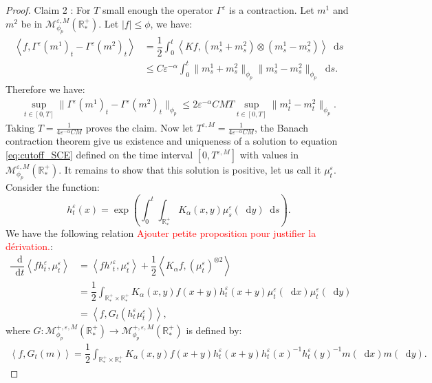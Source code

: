 \documentclass[11pt,a4paper]{article}
\newcommand{\RRP}{\mathbb{R}^+_*}
\newcommand{\MC}{\mathcal{M}}
\newcommand{\red}[1]{\textcolor{red}{#1}}
\newcommand{\brac}[1]{\left\langle#1\right\rangle}
\newcommand{\dd}{\mathop{}\!\mathrm{d}}
\begin{document}
\begin{proof}
    Claim 2 : For $T$ small enough the operator $\Gamma^\varepsilon$ is a contraction. Let $m^1$ and $m^2$ be in $\MC^{\varepsilon,M}_{\phi_p}\left(\RRP\right)$. Let $|f| \leq \phi$, we have:
    \begin{align*}
        \brac{f,\Gamma^\varepsilon(m^1)_t - \Gamma^\varepsilon(m^2)_t}
        &= \dfrac{1}{2}\int_0^t \brac{Kf,\left(m^1_s + m^2_s\right)\otimes\left( m^1_s - m^2_s\right)} \dd s \\
        &\leq C\varepsilon^{-\alpha}\int_0^t \|m^1_s + m^2_s\|_{\phi_p} \|m^1_s - m^2_s\|_{\phi_p}\dd s .
    \end{align*}
    Therefore we have:
    \begin{align*}
        \sup\limits_{t \in [0,T]} \|\Gamma^\varepsilon(m^1)_t - \Gamma^\varepsilon(m^2)_t\|_{\phi_p} \leq 2\varepsilon^{-\alpha} CMT\sup\limits_{t \in [0,T]} \|m^1_t - m^2_t\|_{\phi_p} .
    \end{align*}
    Taking $T = \frac{1}{4\varepsilon^{-\alpha}CM}$ proves the claim. Now let $T^{\varepsilon,M} = \frac{1}{4\varepsilon^{-\alpha}CM}$, the Banach contraction theorem give us existence and uniqueness of a solution to equation \eqref{eq:cutoff_SCE} defined on the time interval $[0,T^{\varepsilon,M}]$ with values in $\MC^{\varepsilon,M}_{\phi_p}\left(\RRP\right)$. It remains to show that this solution is positive, let us call it $\mu_t^\varepsilon$. Consider the function:
    \[
    h^\varepsilon_t(x) = \exp\left(\int_0^t\int_{\RRP}K_\alpha (x,y) \mu^\varepsilon_s(\dd y) \dd s\right).
    \]
    We have the following relation \red{Ajouter petite proposition pour justifier la dérivation.}:
    \begin{align*}
        \dfrac{\dd}{\dd t}\brac{fh^\varepsilon_t,\mu^\varepsilon_t} &= \brac{fh'^{\varepsilon}_t,\mu^\varepsilon_t} + \dfrac{1}{2}\brac{K_\alpha f,\left(\mu^\varepsilon_t\right)^{\otimes 2}}\\
        &= \dfrac{1}{2}\int_{\RRP\times\RRP} K_\alpha(x,y) f(x+y)h^\varepsilon_t(x+y)\mu^\varepsilon_t(\dd x)\mu^\varepsilon_t(\dd y) \\
        &= \brac{f,G_t(h^\varepsilon_t\mu^\varepsilon_t)},
    \end{align*}
    where $G : \MC^{+,\varepsilon,M}_{\phi_p}(\RRP) \to \MC^{+,\varepsilon,M}_{\phi_p}(\RRP)$ is defined by:
    \begin{align*}
        \brac{f,G_t(m)} =  \dfrac{1}{2}\int_{\RRP\times\RRP} K_\alpha(x,y) f(x+y)h^\varepsilon_t(x+y) h^\varepsilon_t(x)^{-1} h^\varepsilon_t(y)^{-1}m(\dd x)m(\dd y).
    \end{align*}

\end{proof}
\end{document}
